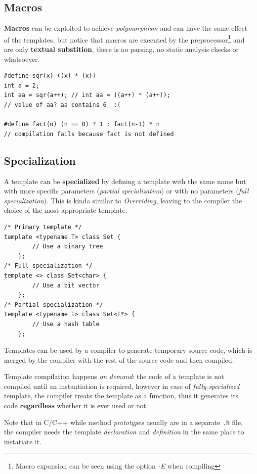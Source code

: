 \subsection{Macros}
\textbf{Macros} can be exploited to achieve \textit{polymorphism} and can have the same effect of the templates,
but notice that macros are executed by the preprocessor\footnote{Macro expansion can be seen using the option \textit{-E} when compiling} and are only \textbf{textual substition},
there is no parsing, no static analysis checks or whatsoever.
\begin{lstlisting}
#define sqr(x) ((x) * (x))
int a = 2;
int aa = sqr(a++); // int aa = ((a++) * (a++));
// value of aa? aa contains 6  :(

#define fact(n) (n == 0) ? 1 : fact(n-1) * n
// compilation fails because fact is not defined
\end{lstlisting}


\subsection{Specialization}
A template can be \textbf{specialized} by defining a template with the same name but with more specific parameters (\textit{partial specialization}) or with no parameters (\textit{full specialization}).
This is kinda similar to \textit{Overriding},
leaving to the compiler the choice of the most appropriate template.

\begin{lstlisting}
/* Primary template */
template <typename T> class Set {
        // Use a binary tree
    };
/* Full specialization */
template <> class Set<char> {
        // Use a bit vector
    };
/* Partial specialization */
template <typename T> class Set<T*> {
        // Use a hash table
    };
\end{lstlisting}

Templates can be used by a compiler to
generate temporary source code, which is
merged by the compiler with the rest of the
source code and then compiled.

Template compilation happens \textit{on demand}: the code of a template
is not compiled until an instantiation is required,
however in case of \textit{fully-specialized} template,
the compiler treats the template as a function, thus it generates its code \textbf{regardless} whether it is ever used or not.

Note that in C/C++ while method \textit{prototypes} usually are in a separate \lstinline{.h} file,
the compiler needs the template \textit{declaration} and \textit{definition} in the same place to instatiate it. 

\lstset{style=javaBlockAnn}